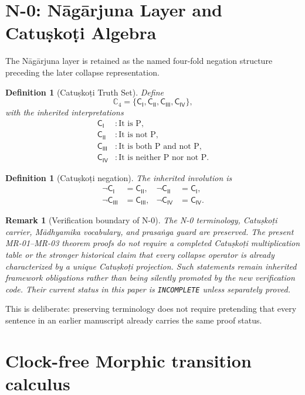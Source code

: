 \documentclass[11pt]{article}
\newtheorem{definition}[theorem]{Definition}
\newtheorem{remark}[theorem]{Remark}
\newcommand{\catkoone}{\mathsf{C}_{\mathsf{I}}}
\newcommand{\catkotwo}{\mathsf{C}_{\mathsf{II}}}
\newcommand{\catkothree}{\mathsf{C}_{\mathsf{III}}}
\newcommand{\catkofour}{\mathsf{C}_{\mathsf{IV}}}
\newcommand{\status}[1]{\texttt{#1}}
\begin{document}
\section{N-0: Nāgārjuna Layer and Catuṣkoṭi Algebra}

The Nāgārjuna layer is retained as the named four-fold negation structure preceding the later collapse representation.

\begin{definition}[Catuṣkoṭi Truth Set]
Define
\[
\mathbb C_4
=
\{\catkoone,\catkotwo,\catkothree,\catkofour\},
\]
with the inherited interpretations
\begin{align*}
\catkoone &: \text{It is P},\\
\catkotwo &: \text{It is not P},\\
\catkothree &: \text{It is both P and not P},\\
\catkofour &: \text{It is neither P nor not P}.
\end{align*}
\end{definition}

\begin{definition}[Catuṣkoṭi negation]
The inherited involution is
\begin{align*}
\neg\catkoone&=\catkotwo,&
\neg\catkotwo&=\catkoone,\\
\neg\catkothree&=\catkothree,&
\neg\catkofour&=\catkofour.
\end{align*}
\end{definition}

\begin{remark}[Verification boundary of N-0]
The N-0 terminology, Catuṣkoṭi carrier, Mādhyamika vocabulary, and prasaṅga guard are preserved. The present MR-01--MR-03 theorem proofs do not require a completed Catuṣkoṭi multiplication table or the stronger historical claim that every collapse operator is already characterized by a unique Catuṣkoṭi projection. Such statements remain inherited framework obligations rather than being silently promoted by the new verification code. Their current status in this paper is \status{INCOMPLETE} unless separately proved.
\end{remark}

This is deliberate: preserving terminology does not require pretending that every sentence in an earlier manuscript already carries the same proof status.

\section{Clock-free Morphic transition calculus}
\end{document}
